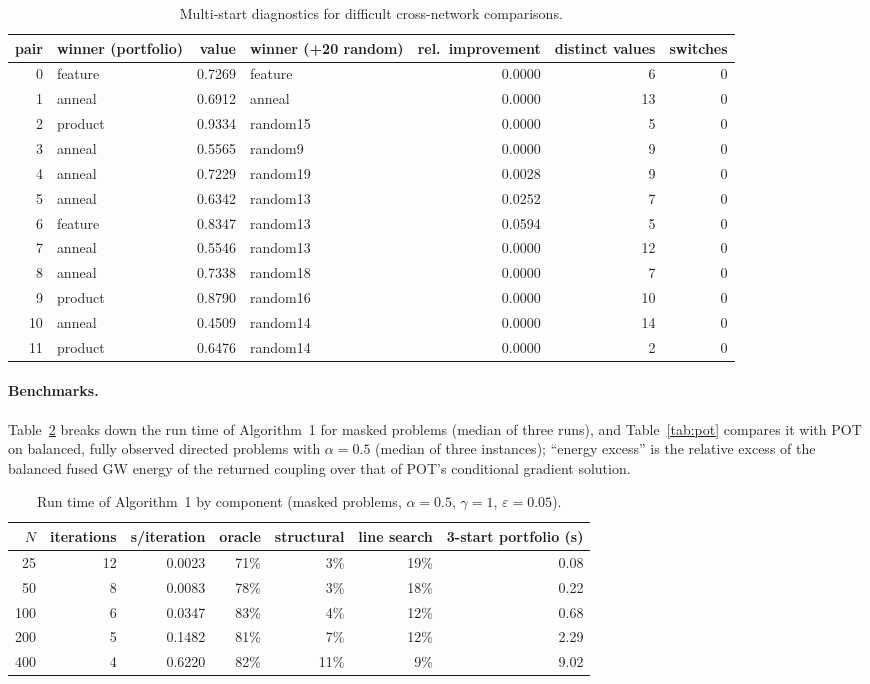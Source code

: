 \documentclass[12pt]{article}
\begin{document}
\begin{table}[h]
\caption{Multi-start diagnostics for difficult cross-network comparisons.}\label{tab:ms}
\centering\footnotesize
\begin{tabular}{rlrlrrr}
\toprule
pair & winner (portfolio) & value & winner (+20 random) & rel.\ improvement & distinct values & switches\\
\midrule
0 & feature & 0.7269 & feature & 0.0000 & 6 & 0\\
1 & anneal & 0.6912 & anneal & 0.0000 & 13 & 0\\
2 & product & 0.9334 & random15 & 0.0000 & 5 & 0\\
3 & anneal & 0.5565 & random9 & 0.0000 & 9 & 0\\
4 & anneal & 0.7229 & random19 & 0.0028 & 9 & 0\\
5 & anneal & 0.6342 & random13 & 0.0252 & 7 & 0\\
6 & feature & 0.8347 & random13 & 0.0594 & 5 & 0\\
7 & anneal & 0.5546 & random13 & 0.0000 & 12 & 0\\
8 & anneal & 0.7338 & random18 & 0.0000 & 7 & 0\\
9 & product & 0.8790 & random16 & 0.0000 & 10 & 0\\
10 & anneal & 0.4509 & random14 & 0.0000 & 14 & 0\\
11 & product & 0.6476 & random14 & 0.0000 & 2 & 0\\
\bottomrule
\end{tabular}

\end{table}

\paragraph{Benchmarks.} Table~\ref{tab:bench} breaks down the run time of Algorithm~1 for masked problems (median of three runs), and Table~\ref{tab:pot} compares it with POT on balanced, fully observed directed problems with $\alpha=0.5$ (median of three instances); ``energy excess'' is the relative excess of the balanced fused GW energy of the returned coupling over that of POT's conditional gradient solution.

\begin{table}[h]
\caption{Run time of Algorithm~1 by component (masked problems, $\alpha=0.5$, $\gamma=1$, $\varepsilon=0.05$).}\label{tab:bench}
\centering\small
\begin{tabular}{rrrrrrr}
\toprule
$N$ & iterations & s/iteration & oracle & structural & line search & 3-start portfolio (s)\\
\midrule
25 & 12 & 0.0023 & 71\% & 3\% & 19\% & 0.08\\
50 & 8 & 0.0083 & 78\% & 3\% & 18\% & 0.22\\
100 & 6 & 0.0347 & 83\% & 4\% & 12\% & 0.68\\
200 & 5 & 0.1482 & 81\% & 7\% & 12\% & 2.29\\
400 & 4 & 0.6220 & 82\% & 11\% & 9\% & 9.02\\
\bottomrule
\end{tabular}

\end{table}
\end{document}

